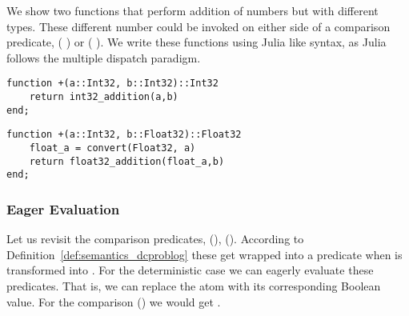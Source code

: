 \begin{example}
We show two functions that perform addition of numbers but with different types. These different number could be invoked on either side of a comparison predicate, \eg ( ) or ( ). We write these functions using Julia like syntax, as Julia follows the multiple dispatch paradigm.
\begin{samepage}

\begin{verbatim}
function +(a::Int32, b::Int32)::Int32
    return int32_addition(a,b)
end;
\end{verbatim}

\end{samepage}


\begin{samepage}
\begin{verbatim}
function +(a::Int32, b::Float32)::Float32
    float_a = convert(Float32, a)
    return float32_addition(float_a,b)
end;
\end{verbatim}

\end{samepage}


\end{example}












\subsubsection*{Eager Evaluation}

Let us revisit the comparison predicates, \eg (), (). According to Definition~\ref{def:semantics_dcproblog} these get wrapped into a  predicate when \dcproblogsty is transformed into \dcplpsty. For the deterministic case we can eagerly evaluate these  predicates. That is, we can replace the atom with its corresponding Boolean value. For the comparison () we would get . 

